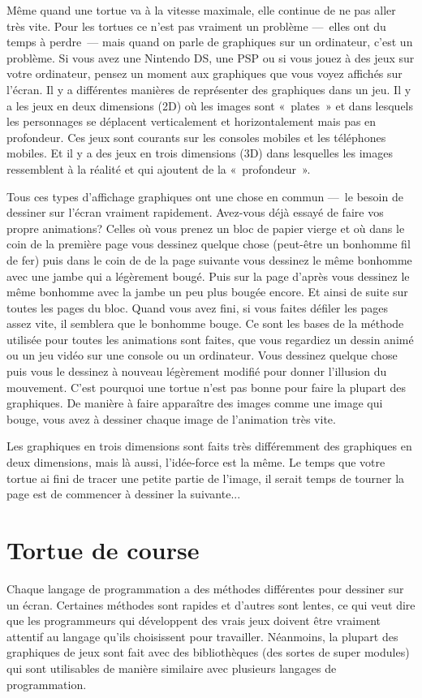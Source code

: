 Même quand une tortue va à la vitesse maximale, elle continue de ne pas aller très vite.
Pour les tortues ce n'est pas vraiment un problème ---~elles ont du temps à perdre~--- mais quand on parle de graphiques sur un ordinateur, c'est un problème. Si vous avez une Nintendo DS, une PSP ou si vous jouez à des 
jeux sur votre ordinateur, pensez un moment aux graphiques que vous voyez affichés sur l'écran. Il y a différentes
manières de représenter des graphiques dans un jeu. Il y a les jeux en deux dimensions (2D) où les images sont «~plates~» et dans lesquels les personnages se déplacent verticalement et horizontalement mais pas en profondeur.
Ces jeux sont courants sur les consoles mobiles et les téléphones mobiles. Et il y a des jeux en trois dimensions (3D) dans lesquelles les images ressemblent à la réalité et qui ajoutent de la «~profondeur~».

Tous ces types d'affichage graphiques ont une chose en commun ---~le besoin de dessiner sur l'écran vraiment rapidement. Avez-vous déjà essayé de faire vos propre animations? Celles où vous prenez un bloc de papier vierge et où dans le coin de la première page vous dessinez quelque chose (peut-être un bonhomme fil de fer) puis dans le coin de de la page suivante vous dessinez le même bonhomme avec une jambe qui a légèrement bougé. Puis sur la page d'après vous dessinez le même bonhomme avec la jambe un peu plus bougée encore. Et ainsi de suite sur toutes les pages du bloc. Quand vous avez fini, si vous faites défiler les pages assez vite, il semblera que le bonhomme bouge. Ce sont les bases de la méthode utilisée pour toutes les animations sont faites, que vous regardiez un dessin animé ou un jeu vidéo sur une console ou un ordinateur. Vous dessinez quelque chose puis vous le dessinez à nouveau légèrement modifié pour donner l'illusion du mouvement. C'est pourquoi une tortue n'est pas bonne pour faire la plupart des graphiques. De manière à faire apparaître des images comme une image qui bouge, vous avez à dessiner chaque image de l'animation très vite.

Les graphiques en trois dimensions sont faits très différemment des graphiques en deux dimensions, mais là aussi, l'idée-force est la même. Le temps que votre tortue ai fini de tracer une petite partie de l'image, il serait temps de tourner la page est de commencer à dessiner la suivante...



\section{Tortue de course}
Chaque langage de programmation a des méthodes différentes pour dessiner sur un écran. Certaines méthodes sont rapides et d'autres sont lentes, ce qui veut dire que les programmeurs qui développent des vrais jeux 
doivent être vraiment attentif au langage qu'ils choisissent pour travailler. Néanmoins, la plupart des graphiques de jeux sont fait avec des bibliothèques (des sortes de super modules) qui sont utilisables de manière similaire avec plusieurs langages de programmation.

